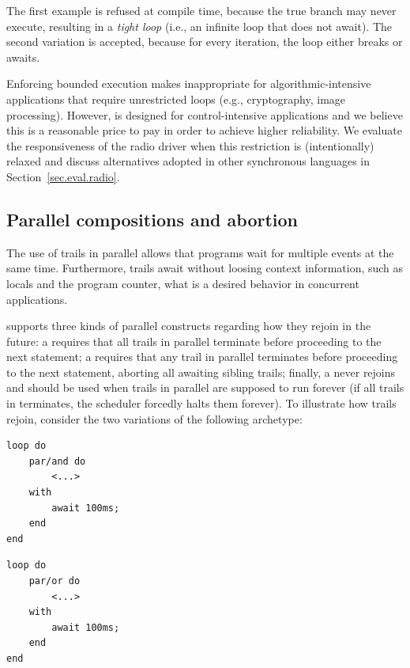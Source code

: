 The first example is refused at compile time, because the  true branch 
may never execute, resulting in a \emph{tight loop} (i.e., an infinite loop 
that does not await).
The second variation is accepted, because for every iteration, the loop either 
breaks or awaits.

Enforcing bounded execution makes \CEU inappropriate for algorithmic-intensive 
applications that require unrestricted loops (e.g., cryptography, image 
processing).
However, \CEU is designed for control-intensive applications and we believe 
this is a reasonable price to pay in order to achieve higher reliability.
%
We evaluate the responsiveness of the radio driver when this restriction is 
(intentionally) relaxed and discuss alternatives adopted in other synchronous 
languages in Section~\ref{sec.eval.radio}.

\subsection{Parallel compositions and abortion}
\label{sec.ceu.par}

The use of trails in parallel allows that programs wait for multiple events at 
the same time.
Furthermore, trails await without loosing context information, such as locals 
and the program counter, what is a desired behavior in concurrent 
applications.~\cite{sync_async.cooperative}

\CEU supports three kinds of parallel constructs regarding how they rejoin in 
the future:
a  requires that all trails in parallel terminate before 
proceeding to the next statement;
a  requires that any trail in parallel terminates before 
proceeding to the next statement, aborting all awaiting sibling trails;
finally, a  never rejoins and should be used when trails in parallel 
are supposed to run forever (if all trails in  terminates, the 
scheduler forcedly halts them forever).
%
To illustrate how trails rejoin, consider the two variations of the following 
archetype:

\begin{minipage}[t]{0.40\linewidth}
\begin{lstlisting}
loop do
    par/and do
        <...>
    with
        await 100ms;
    end
end
\end{lstlisting}
\end{minipage}
%
\begin{minipage}[t]{0.40\linewidth}
\begin{lstlisting}
loop do
    par/or do
        <...>
    with
        await 100ms;
    end
end
\end{lstlisting}
\end{minipage}

